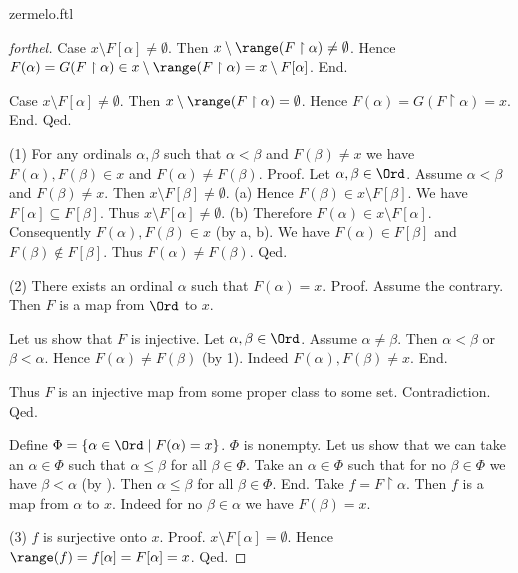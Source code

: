 \documentclass{naproche-library}
\begin{document}
\begin{smodule}[title=Zermelo's Well-Ordering Theorem]{zermelo.ftl}
\begin{proof}[forthel]
    Case $x \setminus F[\alpha] \neq \emptyset$.
      Then $x \setminus \range(F \restriction \alpha) \neq \emptyset$.
      Hence $F(\alpha)
        = G(F \restriction \alpha)
        \in x \setminus \range(F \restriction \alpha)
        = x \setminus F[\alpha]$.
    End.

    Case $x \setminus F[\alpha] \neq \emptyset$.
      Then $x \setminus \range(F \restriction \alpha) = \emptyset$.
      Hence $F(\alpha)
        = G(F \restriction \alpha)
        = x$.
    End.
  Qed.

  (1) For any ordinals $\alpha, \beta$ such that $\alpha < \beta$ and $F(\beta) \neq x$ we have $F(\alpha), F(\beta) \in x$ and $F(\alpha) \neq F(\beta)$. \newline
  Proof.
    Let $\alpha, \beta \in \Ord$.
    Assume $\alpha < \beta$ and $F(\beta) \neq x$.
    Then $x \setminus F[\beta] \neq \emptyset$.
    (a) Hence $F(\beta) \in x \setminus F[\beta]$.
    We have $F[\alpha] \subseteq F[\beta]$.
    Thus $x \setminus F[\alpha] \neq \emptyset$.
    (b) Therefore $F(\alpha) \in x \setminus F[\alpha]$.
    Consequently $F(\alpha), F(\beta) \in x$ (by a, b).
    We have $F(\alpha) \in F[\beta]$ and $F(\beta) \notin F[\beta]$.
    Thus $F(\alpha) \neq F(\beta)$.
  Qed.

  (2) There exists an ordinal $\alpha$ such that $F(\alpha) = x$. \newline
  Proof.
    Assume the contrary.
    Then $F$ is a map from $\Ord$ to $x$.

    Let us show that $F$ is injective.
      Let $\alpha, \beta \in \Ord$.
      Assume $\alpha \neq \beta$.
      Then $\alpha < \beta$ or $\beta < \alpha$.
      Hence $F(\alpha) \neq F(\beta)$ (by 1).
      Indeed $F(\alpha), F(\beta) \neq x$.
    End.

    Thus $F$ is an injective map from some proper class to some set.
    Contradiction.
  Qed.

  Define $\Phi = \{ \alpha \in \Ord \mid F(\alpha) = x \}$.
  $\Phi$ is nonempty.
  Let us show that we can take an $\alpha \in \Phi$ such that $\alpha \leq \beta$ for all $\beta \in \Phi$.
    Take an $\alpha \in \Phi$ such that for no $\beta \in \Phi$ we have $\beta < \alpha$ (by ).
    Then $\alpha \leq \beta$ for all $\beta \in \Phi$.
  End.
  Take $f = F \restriction \alpha$.
  Then $f$ is a map from $\alpha$ to $x$.
  Indeed for no $\beta \in \alpha$ we have $F(\beta) = x$.

  (3) $f$ is surjective onto $x$. \newline
  Proof.
    $x \setminus F[\alpha] = \emptyset$.
    Hence $\range(f)
      = f[\alpha]
      = F[\alpha]
      = x$.
  Qed.


\end{proof}
\end{smodule}
\end{document}
